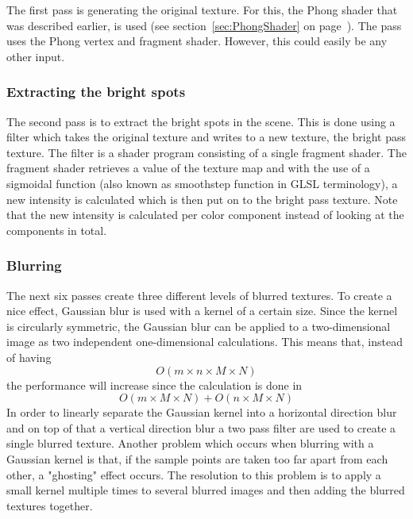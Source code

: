 \documentclass[a4paper,12pt]{article}
\begin{document}
The first pass is generating the original texture. For this, the Phong shader that was described earlier, is used (see section~\ref{sec:PhongShader} on page~\pageref{sec:PhongShader}). The pass uses the Phong vertex and fragment shader. However, this could easily be any other input.

\subsubsection{Extracting the bright spots}
\label{sec:ExtractingTheBrightSpots}
The second pass is to extract the bright spots in the scene. This is done using a filter which takes the original texture and writes to a new texture, the bright pass texture. The filter is a shader program consisting of a single fragment shader. The fragment shader retrieves a value of the texture map and with the use of a sigmoidal function (also known as smoothstep function in GLSL terminology), a new intensity is calculated which is then put on to the bright pass texture. Note that the new intensity is calculated per color component instead of looking at the components in total.

\subsubsection{Blurring}
\label{sec:Blurring}
The next six passes create three different levels of blurred textures. To create a nice effect, Gaussian blur is used with a kernel of a certain size. Since the kernel is circularly symmetric, the Gaussian blur can be applied to a two-dimensional image as two independent one-dimensional calculations. This means that, instead of having \[O(m \times n \times M \times N)\] the performance will increase since the calculation is done in \[ O(m \times M \times N) + O(n \times M \times N) \] In order to linearly separate the Gaussian kernel into a horizontal direction blur and on top of that a vertical direction blur a two pass filter are used to create a single blurred texture.
Another problem which occurs when blurring with a Gaussian kernel is that, if the sample points are taken too far apart from each other, a "ghosting" effect occurs. The resolution to this problem is to apply a small kernel multiple times to several blurred images and then adding the blurred textures together. %
\end{document}
